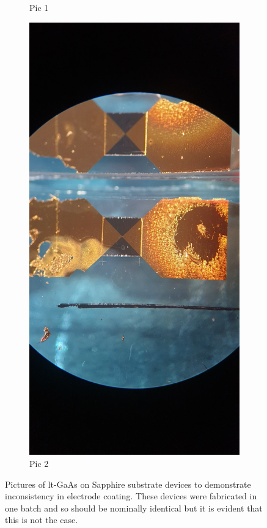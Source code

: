 \begin{figure}[h!]
\begin{subfigure}{1\textwidth}
    \caption{Pic 1}
    \label{fig:devicepic1}
\end{subfigure}
\begin{subfigure}{1\textwidth}
    \centering
    \includegraphics[scale=0.07]{Figures/Misc/SysDev/20220428_104216.jpg}
    \caption{Pic 2}
    \label{fig:devicepic2}
\end{subfigure}
\captionsetup{font = footnotesize, justification = centering}
\caption[Pictures of LT-GaAs on Sapphire Substrate Devices]{Pictures of \acrshort{lt}\nobreakdash-GaAs on Sapphire substrate devices to demonstrate inconsistency in electrode coating. These devices were fabricated in one batch and so should be nominally identical but it is evident that this is not the case.}
\label{fig:pcdeviceexamplepic}
\end{figure}

